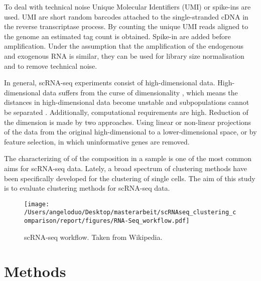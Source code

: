 \documentclass[11pt, a4paper]{article}\usepackage[]{graphicx}\usepackage[]{color}
\begin{document}
To deal with technical noise Unique Molecular Identifiers (UMI) or spike-ins are used. UMI are short random barcodes attached to the single-stranded cDNA in the reverse transcriptase process. By counting the unique UMI reads aligned to the genome an estimated tag count is obtained. Spike-in are added before amplification. Under the assumption that the amplification of the endogenous and exogenous RNA is similar, they can be used for library size normalisation and to remove technical noise. 

In general, scRNA-seq experiments consist of high-dimensional data. High-dimensional data suffers from the curse of dimensionality \citep{wagner2016revealing}, which means the distances in high-dimensional data become unstable and subpopulations cannot be separated \citep{andrews2017identifying}. Additionally, computational requirements are high. Reduction of the dimension is made by two approaches. Using linear or non-linear projections of the data from the original high-dimensional to a lower-dimensional space, or by feature selection, in which uninformative genes are removed.

The characterizing of of the composition in a sample is one of the most common aims for scRNA-seq data. Lately, a broad spectrum of clustering methods have been specifically developed for the clustering of single cells. The aim of this study is to evaluate clustering methods for scRNA-seq data.
\begin{figure}[!h]
\begin{center}
\texttt{[image: /Users/angeloduo/Desktop/masterarbeit/scRNAseq\_clustering\_comparison/report/figures/RNA-Seq\_workflow.pdf]}
\caption{scRNA-seq workflow. Taken from Wikipedia. }
\label{fig:flow}
\end{center}
\end{figure}
\clearpage
\newpage

\section{Methods}
\end{document}
